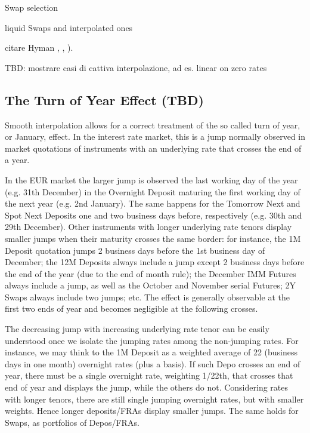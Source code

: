 \documentclass[11pt,reqno]{amsart}
\begin{document}
Swap selection

liquid Swaps and interpolated ones

citare Hyman \cite{Hym1983}, \cite{HagWes06}, \cite{HagWes08}).

TBD: mostrare casi di cattiva interpolazione, ad es. linear on zero rates

\subsection{\label{sec:TOY}The Turn of Year Effect (TBD)}
\par
Smooth interpolation allows for a correct treatment of the so called turn of year, or January, effect.
In the interest rate market, this is a jump normally observed in market quotations of instruments with an underlying rate that crosses the end of a year.
\par
In the EUR market the larger jump is observed the last working day of the year (e.g. 31th December) in the Overnight Deposit maturing the first working day of the next year (e.g. 2nd January).
The same happens for the Tomorrow Next and Spot Next Deposits one and two business days before, respectively (e.g. 30th and 29th December).
Other instruments with longer underlying rate tenors display smaller jumps when their maturity crosses the same border: for instance, the 1M Deposit quotation jumps 2 business days before the 1st business day of December; the 12M Deposits always include a jump except 2 business days before the end of the year (due to the end of month rule); the December IMM Futures always include a jump, as well as the October and November serial Futures; 2Y Swaps always include two jumps; etc.
The effect is generally observable at the first two ends of year and becomes negligible at the following crosses.
\par
The decreasing jump with increasing underlying rate tenor can be easily understood once we isolate the jumping rates among the non-jumping rates.
For instance, we may think to the 1M Deposit as a weighted average of 22 (business days in one month) overnight rates (plus a basis). If such Depo crosses an end of year, there must be a single overnight rate, weighting 1/22th, that crosses that end of year and displays the jump, while the others do not. Considering rates with longer tenors, there are still single jumping overnight rates, but with smaller weights. Hence longer deposits/FRAs display smaller jumps. The same holds for Swaps, as portfolios of Depos/FRAs.
\par
\end{document}
